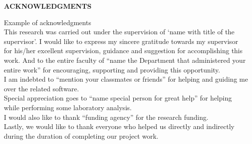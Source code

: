 



\begin{center}
	{\Large{\bf{ACKNOWLEDGMENTS}}}\\
\end{center}

\noindent
Example of acknowledgments\\

\noindent
This research was carried out under the supervision of `name with title of the supervisor'. I would like to express my sincere gratitude towards my supervisor for his/her excellent supervision, guidance and suggestion for accomplishing this work. And to the entire faculty of ``name the Department that administered your entire work'' for encouraging, supporting and providing this opportunity.\\

\noindent
I am indebted to ``mention your classmates or friends'' for helping and guiding me over the related software. \\

\noindent
Special appreciation goes to ``name special person for great help'' for helping while performing some laboratory analysis. \\

\noindent
I would also like to thank ``funding agency''  for the research funding.\\


\noindent
Lastly, we would like to thank everyone who helped us directly and indirectly during the duration of completing our project work.



